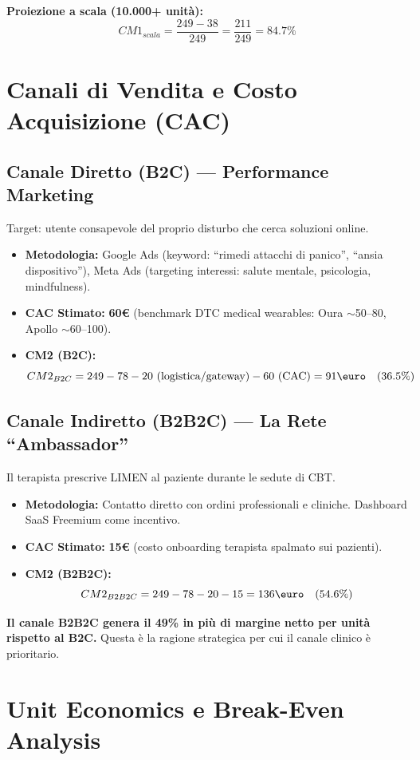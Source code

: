 \documentclass[12pt,a4paper]{article}
\begin{document}
\textbf{Proiezione a scala (10.000+ unità):}
$$CM1_{scala} = \frac{249 - 38}{249} = \frac{211}{249} = 84.7\%$$

\section{Canali di Vendita e Costo Acquisizione (CAC)}

\subsection{Canale Diretto (B2C) --- Performance Marketing}
Target: utente consapevole del proprio disturbo che cerca soluzioni online.
\begin{itemize}
    \item \textbf{Metodologia:} Google Ads (keyword: ``rimedi attacchi di panico'', ``ansia dispositivo''), Meta Ads (targeting interessi: salute mentale, psicologia, mindfulness).
    \item \textbf{CAC Stimato:} \textbf{60\euro} (benchmark DTC medical wearables: Oura $\sim$50--80, Apollo $\sim$60--100).
    \item \textbf{CM2 (B2C):}
    $$CM2_{B2C} = 249 - 78 - 20\text{ (logistica/gateway)} - 60\text{ (CAC)} = 91\text{\euro} \quad (36.5\%)$$
\end{itemize}

\subsection{Canale Indiretto (B2B2C) --- La Rete ``Ambassador''}
Il terapista prescrive LIMEN al paziente durante le sedute di CBT.
\begin{itemize}
    \item \textbf{Metodologia:} Contatto diretto con ordini professionali e cliniche. Dashboard SaaS Freemium come incentivo.
    \item \textbf{CAC Stimato:} \textbf{15\euro} (costo onboarding terapista spalmato sui pazienti).
    \item \textbf{CM2 (B2B2C):}
    $$CM2_{B2B2C} = 249 - 78 - 20 - 15 = 136\text{\euro} \quad (54.6\%)$$
\end{itemize}

\textbf{Il canale B2B2C genera il 49\% in più di margine netto per unità rispetto al B2C.} Questa è la ragione strategica per cui il canale clinico è prioritario.

\section{Unit Economics e Break-Even Analysis}
\end{document}
